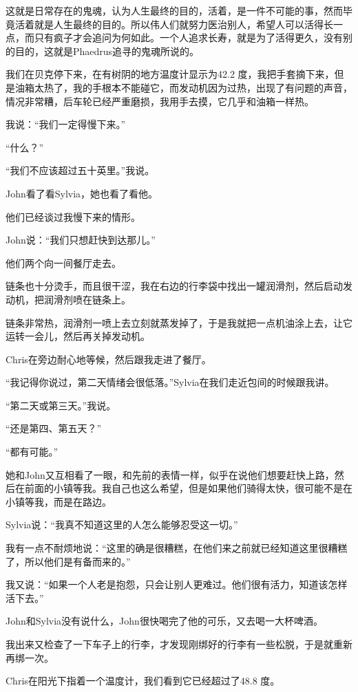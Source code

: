 \documentclass[UTF8]{article}
\begin{document}
\par 这就是日常存在的鬼魂，认为人生最终的目的，活着，是一件不可能的事，然而毕竟活着就是人生最终的目的。所以伟人们就努力医治别人，希望人可以活得长一点，而只有疯子才会追问为何如此。一个人追求长寿，就是为了活得更久，没有别的目的，这就是Phaedrus追寻的鬼魂所说的。
\par 我们在贝克停下来，在有树阴的地方温度计显示为42.2 度，我把手套摘下来，但是油箱太热了，我的手根本不能碰它，而发动机因为过热，出现了有问题的声音，情况非常糟，后车轮已经严重磨损，我用手去摸，它几乎和油箱一样热。
\par 我说：“我们一定得慢下来。”
\par “什么？”
\par “我们不应该超过五十英里。”我说。
\par John看了看Sylvia，她也看了看他。
\par 他们已经谈过我慢下来的情形。
\par John说：“我们只想赶快到达那儿。”
\par 他们两个向一间餐厅走去。
\par 链条也十分烫手，而且很干涩，我在右边的行李袋中找出一罐润滑剂，然后启动发动机，把润滑剂喷在链条上。
\par 链条非常热，润滑剂一喷上去立刻就蒸发掉了，于是我就把一点机油涂上去，让它运转一会儿，然后再关掉发动机。
\par Chris在旁边耐心地等候，然后跟我走进了餐厅。
\par “我记得你说过，第二天情绪会很低落。”Sylvia在我们走近包间的时候跟我讲。
\par “第二天或第三天。”我说。
\par “还是第四、第五天？”
\par “都有可能。”
\par 她和John又互相看了一眼，和先前的表情一样，似乎在说他们想要赶快上路，然后在前面的小镇等我。我自己也这么希望，但是如果他们骑得太快，很可能不是在小镇等我，而是在路边。
\par Sylvia说：“我真不知道这里的人怎么能够忍受这一切。”
\par 我有一点不耐烦地说：“这里的确是很糟糕，在他们来之前就已经知道这里很糟糕了，所以他们是有备而来的。”
\par 我又说：“如果一个人老是抱怨，只会让别人更难过。他们很有活力，知道该怎样活下去。”
\par John和Sylvia没有说什么，John很快喝完了他的可乐，又去喝一大杯啤酒。
\par 我出来又检查了一下车子上的行李，才发现刚绑好的行李有一些松脱，于是就重新再绑一次。
\par Chris在阳光下指着一个温度计，我们看到它已经超过了48.8 度。
\end{document}
